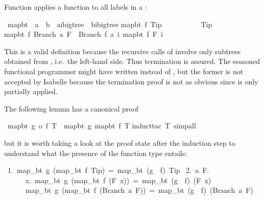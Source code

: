 \begin{isabellebody}
\begin{isamarkuptext}
Function  applies a function to all labels in a :%
\end{isamarkuptext}%
\ map{\isacharunderscore}bt\ {\isacharcolon}{\isacharcolon}\ {\isachardoublequote}{\isacharparenleft}{\isacharprime}a\ {\isasymRightarrow}\ {\isacharprime}b{\isacharparenright}\ {\isasymRightarrow}\ {\isacharparenleft}{\isacharprime}a{\isacharcomma}{\isacharprime}i{\isacharparenright}bigtree\ {\isasymRightarrow}\ {\isacharparenleft}{\isacharprime}b{\isacharcomma}{\isacharprime}i{\isacharparenright}bigtree{\isachardoublequote}\isanewline
{}\isanewline
{\isachardoublequote}map{\isacharunderscore}bt\ f\ Tip\ \ \ \ \ \ \ \ \ \ {\isacharequal}\ Tip{\isachardoublequote}\isanewline
{\isachardoublequote}map{\isacharunderscore}bt\ f\ {\isacharparenleft}Branch\ a\ F{\isacharparenright}\ {\isacharequal}\ Branch\ {\isacharparenleft}f\ a{\isacharparenright}\ {\isacharparenleft}{\isasymlambda}i{\isachardot}\ map{\isacharunderscore}bt\ f\ {\isacharparenleft}F\ i{\isacharparenright}{\isacharparenright}{\isachardoublequote}%
\begin{isamarkuptext}%
\noindent This is a valid  definition because the
recursive calls of  involve only subtrees obtained from
, i.e.\ the left-hand side. Thus termination is assured.  The
seasoned functional programmer might have written 
instead of , but the former is not accepted by
Isabelle because the termination proof is not as obvious since
 is only partially applied.

The following lemma has a canonical proof%
\end{isamarkuptext}%
\ {\isachardoublequote}map{\isacharunderscore}bt\ {\isacharparenleft}g\ o\ f{\isacharparenright}\ T\ {\isacharequal}\ map{\isacharunderscore}bt\ g\ {\isacharparenleft}map{\isacharunderscore}bt\ f\ T{\isacharparenright}{\isachardoublequote}\isanewline
{}induct{\isacharunderscore}tac\ {\isachardoublequote}T{\isachardoublequote}{\isacharcomma}\ simp{\isacharunderscore}all{\isacharparenright}%
\begin{isamarkuptext}%
\noindent
but it is worth taking a look at the proof state after the induction step
to understand what the presence of the function type entails:
\begin{isabelle}
~1.~map\_bt~g~(map\_bt~f~Tip)~=~map\_bt~(g~{\isasymcirc}~f)~Tip\isanewline
~2.~{\isasymAnd}a~F.\isanewline
~~~~~~{\isasymforall}x.~map\_bt~g~(map\_bt~f~(F~x))~=~map\_bt~(g~{\isasymcirc}~f)~(F~x)~{\isasymLongrightarrow}\isanewline
~~~~~~map\_bt~g~(map\_bt~f~(Branch~a~F))~=~map\_bt~(g~{\isasymcirc}~f)~(Branch~a~F)%
\end{isabelle}%
\end{isamarkuptext}%
\end{isabellebody}%
